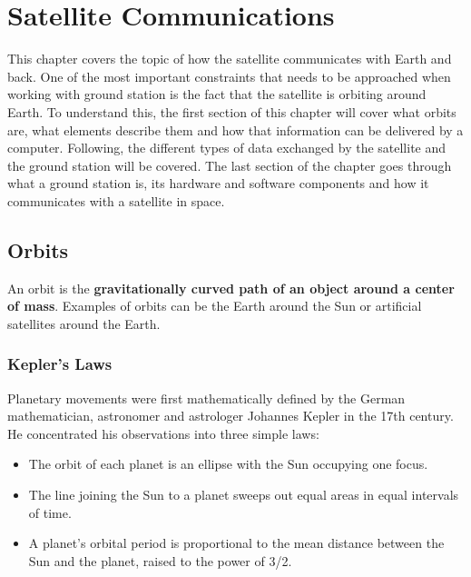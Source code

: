 

\chapter{Satellite Communications}

This chapter covers the topic of how the satellite communicates with Earth and back. One of the most important constraints that needs to be approached when working with ground station is the fact that the satellite is orbiting around Earth. To understand this, the first section of this chapter will cover what orbits are, what elements describe them and how that information can be delivered by a computer. Following, the different types of data exchanged by the satellite and the ground station will be covered. The last section of the chapter goes through what a ground station is, its hardware and software components and how it communicates with a satellite in space.


\section{Orbits}\label{2.1}
An orbit is the \textbf{gravitationally curved path of an object around a center of mass}. Examples of orbits can be the Earth around the Sun or artificial satellites around the Earth.



\subsection{Kepler's Laws}\label{2.1}
Planetary movements were first mathematically defined by the German mathematician, astronomer and astrologer Johannes Kepler in the 17th century. He concentrated his observations into three simple laws\citep{SSEng}:
\begin{itemize}

\item The orbit of each planet is an ellipse with the Sun occupying one focus.
\item The line joining the Sun to a planet sweeps out equal areas in equal intervals of time.
\item A planet's orbital period is proportional to the mean distance between the Sun and the planet, raised to the power of 3/2.
\end{itemize} 

